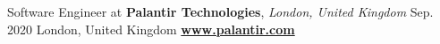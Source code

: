 \cveventflat
{Software Engineer at }
{\textbf{Palantir Technologies}, \textit{London, United Kingdom}}
{Sep. 2020}
{London, United Kingdom}
\newline
\href{https://www.palantir.com/}{\textbf{www.palantir.com}}
